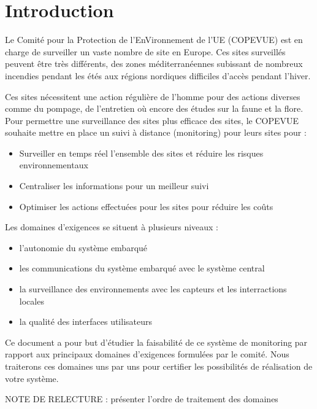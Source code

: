 \section{Introduction}

Le Comité pour la Protection de l'EnVironnement de l'UE (COPEVUE) est en charge de surveiller un vaste nombre de site en Europe. Ces sites surveillés peuvent être très différents, des zones méditerranéennes subissant de nombreux incendies pendant les étés aux régions nordiques difficiles d'accès pendant l'hiver. 

Ces sites nécessitent une action régulière de l'homme pour des actions diverses comme du pompage, de l'entretien où encore des études sur la faune et la flore. Pour permettre une surveillance des sites plus efficace des sites, le COPEVUE souhaite mettre en place un suivi à distance (monitoring) pour leurs sites pour : 

\begin{itemize}
\item Surveiller en temps réel l'ensemble des sites et réduire les risques environnementaux
\item Centraliser les informations pour un meilleur suivi
\item Optimiser les actions effectuées pour les sites pour réduire les coûts
\end{itemize}

Les domaines d'exigences se situent à plusieurs niveaux : 

\begin{itemize}
\item l'autonomie du système embarqué
\item les communications du système embarqué avec le système central
\item la surveillance des environnements avec les capteurs et les interractions locales
\item la qualité des interfaces utilisateurs
\end{itemize}

Ce document a pour but d'étudier la faisabilité de ce système de monitoring par rapport aux principaux domaines d'exigences formulées par le comité. Nous traiterons ces domaines uns par uns pour certifier les possibilités de réalisation de votre système.

NOTE DE RELECTURE : présenter l'ordre de traitement des domaines 
